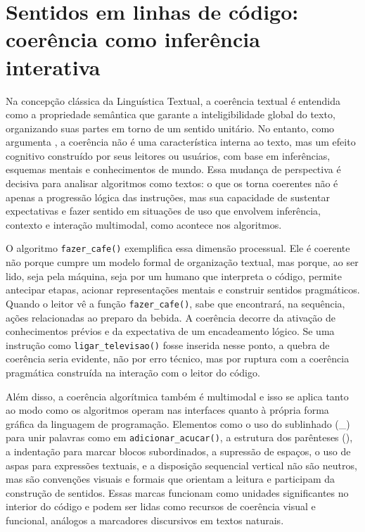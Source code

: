 \documentclass[portuguese]{textolivre}
\begin{document}
\section{Sentidos em linhas de código: coerência como inferência interativa}\label{sec-modelo}
Na concepção clássica da Linguística Textual, a coerência textual é entendida como a propriedade semântica que garante a inteligibilidade global do texto, organizando suas partes em torno de um sentido unitário. No entanto, como argumenta \textcite{koch2006}, a coerência não é uma característica interna ao texto, mas um efeito cognitivo construído por seus leitores ou usuários, com base em inferências, esquemas mentais e conhecimentos de mundo. Essa mudança de perspectiva é decisiva para analisar algoritmos como textos: o que os torna coerentes não é apenas a progressão lógica das instruções, mas sua capacidade de sustentar expectativas e fazer sentido em situações de uso que envolvem inferência, contexto e interação multimodal, como acontece nos algoritmos.

O algoritmo \lstinline[language=Python]{fazer_cafe()} exemplifica essa dimensão processual. Ele é coerente não porque cumpre um modelo formal de organização textual, mas porque, ao ser lido, seja pela máquina, seja por um humano que interpreta o código, permite antecipar etapas, acionar representações mentais e construir sentidos pragmáticos. Quando o leitor vê a função \lstinline[language=Python]{fazer_cafe()}, sabe que encontrará, na sequência, ações relacionadas ao preparo da bebida. A coerência decorre da ativação de conhecimentos prévios e da expectativa de um encadeamento lógico. Se uma instrução como \lstinline[language=Python]{ligar_televisao()} fosse inserida nesse ponto, a quebra de coerência seria evidente, não por erro técnico, mas por ruptura com a coerência pragmática construída na interação com o leitor do código.

Além disso, a coerência algorítmica também é multimodal e isso se aplica tanto ao modo como os algoritmos operam nas interfaces quanto à própria forma gráfica da linguagem de programação. Elementos como o uso do sublinhado (\_) para unir palavras como em \lstinline[language=Python]{adicionar_acucar()}, a estrutura dos parênteses (), a indentação para marcar blocos subordinados, a supressão de espaços, o uso de aspas para expressões textuais, e a disposição sequencial vertical não são neutros, mas são convenções visuais e formais que orientam a leitura e participam da construção de sentidos. Essas marcas funcionam como unidades significantes no interior do código e podem ser lidas como recursos de coerência visual e funcional, análogos a marcadores discursivos em textos naturais.
\end{document}
